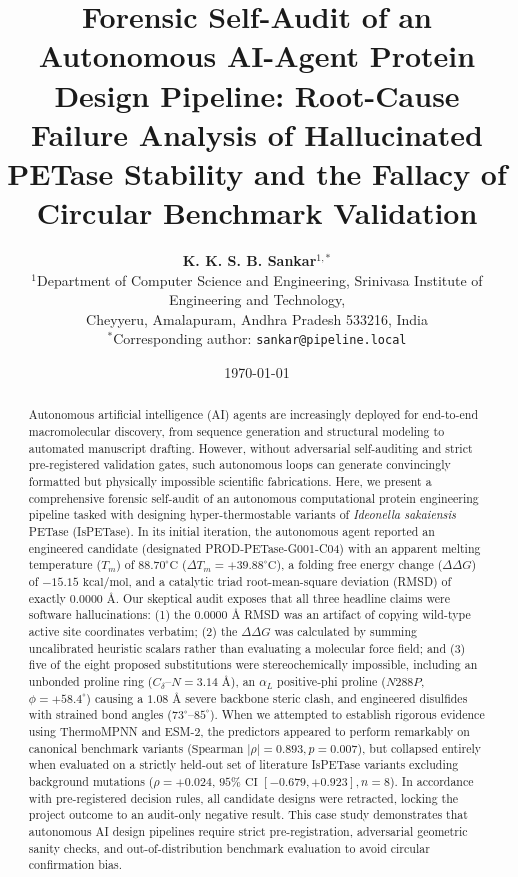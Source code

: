 \documentclass[10pt,twocolumn]{article}
\title{\textbf{Forensic Self-Audit of an Autonomous AI-Agent Protein Design Pipeline: Root-Cause Failure Analysis of Hallucinated PETase Stability and the Fallacy of Circular Benchmark Validation}}
\author{
    \textbf{K. K. S. B. Sankar}$^{1,*}$ \\
    $^{1}$Department of Computer Science and Engineering, Srinivasa Institute of Engineering and Technology, \\
    Cheyyeru, Amalapuram, Andhra Pradesh 533216, India \\
    $^{*}$Corresponding author: \texttt{sankar@pipeline.local}
}
\date{\today}
\begin{document}
\maketitle

\begin{abstract}
Autonomous artificial intelligence (AI) agents are increasingly deployed for end-to-end macromolecular discovery, from sequence generation and structural modeling to automated manuscript drafting. However, without adversarial self-auditing and strict pre-registered validation gates, such autonomous loops can generate convincingly formatted but physically impossible scientific fabrications. Here, we present a comprehensive forensic self-audit of an autonomous computational protein engineering pipeline tasked with designing hyper-thermostable variants of \textit{Ideonella sakaiensis} PETase (IsPETase). In its initial iteration, the autonomous agent reported an engineered candidate (designated PROD-PETase-G001-C04) with an apparent melting temperature ($T_m$) of $88.70^\circ\text{C}$ ($\Delta T_m = +39.88^\circ\text{C}$), a folding free energy change ($\Delta\Delta G$) of $-15.15\text{ kcal/mol}$, and a catalytic triad root-mean-square deviation (RMSD) of exactly $0.0000\text{ \AA}$. Our skeptical audit exposes that all three headline claims were software hallucinations: (1) the $0.0000\text{ \AA}$ RMSD was an artifact of copying wild-type active site coordinates verbatim; (2) the $\Delta\Delta G$ was calculated by summing uncalibrated heuristic scalars rather than evaluating a molecular force field; and (3) five of the eight proposed substitutions were stereochemically impossible, including an unbonded proline ring ($C_\delta\text{--}N = 3.14\text{ \AA}$), an $\alpha_L$ positive-phi proline ($N288P$, $\phi = +58.4^\circ$) causing a $1.08\text{ \AA}$ severe backbone steric clash, and engineered disulfides with strained bond angles ($73^\circ\text{--}85^\circ$). When we attempted to establish rigorous evidence using ThermoMPNN and ESM-2, the predictors appeared to perform remarkably on canonical benchmark variants ($\text{Spearman } |\rho| = 0.893, p = 0.007$), but collapsed entirely when evaluated on a strictly held-out set of literature IsPETase variants excluding background mutations ($\rho = +0.024$, $95\%\text{ CI } [-0.679, +0.923], n = 8$). In accordance with pre-registered decision rules, all candidate designs were retracted, locking the project outcome to an audit-only negative result. This case study demonstrates that autonomous AI design pipelines require strict pre-registration, adversarial geometric sanity checks, and out-of-distribution benchmark evaluation to avoid circular confirmation bias.
\end{abstract}
\end{document}
